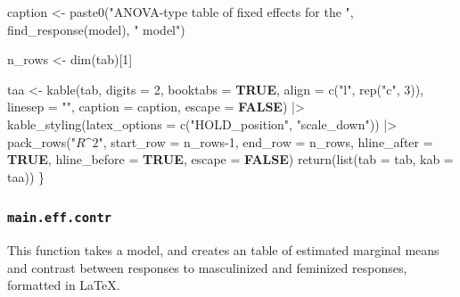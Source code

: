 \documentclass[
  bookmarksnumbered]{article}
\newenvironment{Shaded}{\begin{snugshade}}{\end{snugshade}}
\newcommand{\AttributeTok}[1]{\textcolor[rgb]{0.80,0.80,0.80}{#1}}
\newcommand{\ConstantTok}[1]{\textcolor[rgb]{0.86,0.64,0.64}{\textbf{#1}}}
\newcommand{\DecValTok}[1]{\textcolor[rgb]{0.86,0.86,0.80}{#1}}
\newcommand{\FunctionTok}[1]{\textcolor[rgb]{0.94,0.94,0.56}{#1}}
\newcommand{\NormalTok}[1]{\textcolor[rgb]{0.80,0.80,0.80}{#1}}
\newcommand{\OtherTok}[1]{\textcolor[rgb]{0.94,0.94,0.56}{#1}}
\newcommand{\SpecialCharTok}[1]{\textcolor[rgb]{0.86,0.64,0.64}{#1}}
\newcommand{\StringTok}[1]{\textcolor[rgb]{0.80,0.58,0.58}{#1}}
\begin{document}
\begin{Shaded}
\begin{Highlighting}[]
\NormalTok{    caption }\OtherTok{\textless{}{-}} \FunctionTok{paste0}\NormalTok{(}\StringTok{"ANOVA{-}type table of fixed effects for the "}\NormalTok{, }\FunctionTok{find\_response}\NormalTok{(model), }\StringTok{" model"}\NormalTok{)}
  
\NormalTok{  n\_rows }\OtherTok{\textless{}{-}} \FunctionTok{dim}\NormalTok{(tab)[}\DecValTok{1}\NormalTok{]}
  
\NormalTok{  taa }\OtherTok{\textless{}{-}} \FunctionTok{kable}\NormalTok{(tab,}
               \AttributeTok{digits =} \DecValTok{2}\NormalTok{,}
               \AttributeTok{booktabs =} \ConstantTok{TRUE}\NormalTok{,}
               \AttributeTok{align =} \FunctionTok{c}\NormalTok{(}\StringTok{"l"}\NormalTok{, }\FunctionTok{rep}\NormalTok{(}\StringTok{"c"}\NormalTok{, }\DecValTok{3}\NormalTok{)),}
               \AttributeTok{linesep =} \StringTok{""}\NormalTok{,}
               \AttributeTok{caption =}\NormalTok{ caption,}
               \AttributeTok{escape =} \ConstantTok{FALSE}\NormalTok{) }\SpecialCharTok{|\textgreater{}}
    \FunctionTok{kable\_styling}\NormalTok{(}\AttributeTok{latex\_options =} \FunctionTok{c}\NormalTok{(}\StringTok{"HOLD\_position"}\NormalTok{, }\StringTok{"scale\_down"}\NormalTok{)) }\SpecialCharTok{|\textgreater{}}
    \FunctionTok{pack\_rows}\NormalTok{(}\StringTok{"$R\^{}2$"}\NormalTok{,}
              \AttributeTok{start\_row =}\NormalTok{ n\_rows}\DecValTok{{-}1}\NormalTok{, }\AttributeTok{end\_row =}\NormalTok{ n\_rows,}
              \AttributeTok{hline\_after =} \ConstantTok{TRUE}\NormalTok{, }\AttributeTok{hline\_before =} \ConstantTok{TRUE}\NormalTok{,}
              \AttributeTok{escape =} \ConstantTok{FALSE}\NormalTok{)}
  \FunctionTok{return}\NormalTok{(}\FunctionTok{list}\NormalTok{(}\AttributeTok{tab =}\NormalTok{ tab, }\AttributeTok{kab =}\NormalTok{ taa))}
\NormalTok{\}}
\end{Highlighting}
\end{Shaded}

\subsubsection{\texorpdfstring{\texttt{main.eff.contr}}{main.eff.contr}}\label{main.eff.contr}

This function takes a model, and creates an table of estimated marginal means and contrast between responses to masculinized and feminized responses, formatted in \LaTeX.
\end{document}
